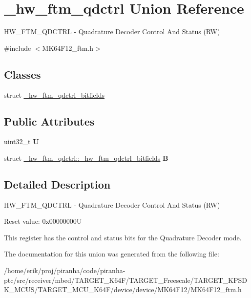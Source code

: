 \hypertarget{union__hw__ftm__qdctrl}{}\section{\+\_\+hw\+\_\+ftm\+\_\+qdctrl Union Reference}
\label{union__hw__ftm__qdctrl}


H\+W\+\_\+\+F\+T\+M\+\_\+\+Q\+D\+C\+T\+RL -\/ Quadrature Decoder Control And Status (RW)  




{\ttfamily \#include $<$M\+K64\+F12\+\_\+ftm.\+h$>$}

\subsection*{Classes}
\begin{DoxyCompactItemize}
\item 
struct \hyperlink{struct__hw__ftm__qdctrl_1_1__hw__ftm__qdctrl__bitfields}{\+\_\+hw\+\_\+ftm\+\_\+qdctrl\+\_\+bitfields}
\end{DoxyCompactItemize}
\subsection*{Public Attributes}
\begin{DoxyCompactItemize}
\item 
uint32\+\_\+t {\bfseries U}\hypertarget{union__hw__ftm__qdctrl_a9fa6c3e198f1eaee13ddd2c161579a98}{}\label{union__hw__ftm__qdctrl_a9fa6c3e198f1eaee13ddd2c161579a98}

\item 
struct \hyperlink{struct__hw__ftm__qdctrl_1_1__hw__ftm__qdctrl__bitfields}{\+\_\+hw\+\_\+ftm\+\_\+qdctrl\+::\+\_\+hw\+\_\+ftm\+\_\+qdctrl\+\_\+bitfields} {\bfseries B}\hypertarget{union__hw__ftm__qdctrl_a77318c3eb9e5c54177e3a47d26c6f882}{}\label{union__hw__ftm__qdctrl_a77318c3eb9e5c54177e3a47d26c6f882}

\end{DoxyCompactItemize}


\subsection{Detailed Description}
H\+W\+\_\+\+F\+T\+M\+\_\+\+Q\+D\+C\+T\+RL -\/ Quadrature Decoder Control And Status (RW) 

Reset value\+: 0x00000000U

This register has the control and status bits for the Quadrature Decoder mode. 

The documentation for this union was generated from the following file\+:\begin{DoxyCompactItemize}
\item 
/home/erik/proj/piranha/code/piranha-\/ptc/src/receiver/mbed/\+T\+A\+R\+G\+E\+T\+\_\+\+K64\+F/\+T\+A\+R\+G\+E\+T\+\_\+\+Freescale/\+T\+A\+R\+G\+E\+T\+\_\+\+K\+P\+S\+D\+K\+\_\+\+M\+C\+U\+S/\+T\+A\+R\+G\+E\+T\+\_\+\+M\+C\+U\+\_\+\+K64\+F/device/device/\+M\+K64\+F12/M\+K64\+F12\+\_\+ftm.\+h\end{DoxyCompactItemize}

